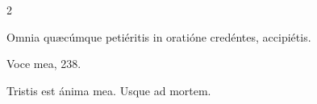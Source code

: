 \documentclass[9pt,twoside]{extarticle}
\begin{document}
\begin{multicols}{2}
%
%
%
%
%
%
%
%
%
%
%
%
%
\begin{tightlist}{}
\item {} Omnia quæcúmque petiéritis in oratióne credéntes, accipiétis.
\item {} Voce mea, 238.
\end{tightlist}
%
%
%
%
%
%
%
%
%
%
%
\begin{tightlist}{}
\item {} Tristis est ánima mea.  Usque ad mortem.
\end{tightlist}


\end{multicols}
\end{document}
